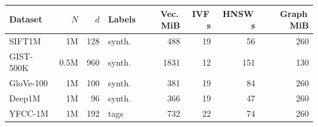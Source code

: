 \begin{tabular}{lrrlrrrr}
\toprule
Dataset & $N$ & $d$ & Labels & Vec.\,MiB & IVF\,s & HNSW\,s & Graph\,MiB \\
\midrule
SIFT1M & 1M & 128 & synth. & 488 & 19 & 56 & 260 \\
GIST-500K & 0.5M & 960 & synth. & 1831 & 12 & 151 & 130 \\
GloVe-100 & 1M & 100 & synth. & 381 & 19 & 84 & 260 \\
Deep1M & 1M & 96 & synth. & 366 & 19 & 47 & 260 \\
YFCC-1M & 1M & 192 & tags & 732 & 22 & 74 & 260 \\
\bottomrule
\end{tabular}
